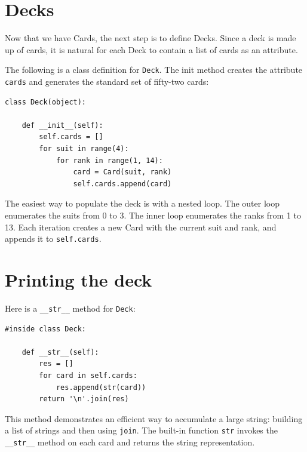 \documentclass[10pt]{book}
\begin{document}
\section{Decks}

Now that we have Cards, the next step is to define Decks.  Since a
deck is made up of cards, it is natural for each Deck to contain a
list of cards as an attribute.


The following is a class definition for {\tt Deck}.  The
init method creates the attribute {\tt cards} and generates
the standard set of fifty-two cards:



\beforeverb
\begin{verbatim}
class Deck(object):

    def __init__(self):
        self.cards = []
        for suit in range(4):
            for rank in range(1, 14):
                card = Card(suit, rank)
                self.cards.append(card)
\end{verbatim}
\afterverb
%
The easiest way to populate the deck is with a nested loop.  The outer
loop enumerates the suits from 0 to 3.  The inner loop enumerates the
ranks from 1 to 13.  Each iteration
creates a new Card with the current suit and rank,
and appends it to {\tt self.cards}.



\section{Printing the deck}
\label{printdeck}


Here is a \verb"__str__" method for {\tt Deck}:

\beforeverb
\begin{verbatim}
#inside class Deck:

    def __str__(self):
        res = []
        for card in self.cards:
            res.append(str(card))
        return '\n'.join(res)
\end{verbatim}
\afterverb
%
This method demonstrates an efficient way to accumulate a large
string: building a list of strings and then using {\tt join}.
The built-in function {\tt str} invokes the \verb"__str__"
method on each card and returns the string representation.
\end{document}
